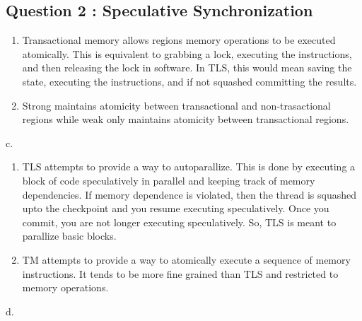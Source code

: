 \subsection{Question 2 : Speculative
Synchronization}\label{question-2-speculative-synchronization}

\begin{enumerate}
\def\labelenumi{\alph{enumi}.}
\item
  Transactional memory allows regions memory operations to be executed
  atomically. This is equivalent to grabbing a lock, executing the
  instructions, and then releasing the lock in software. In TLS, this
  would mean saving the state, executing the instructions, and if not
  squashed committing the results.
\item
  Strong maintains atomicity between transactional and non-trasactional
  regions while weak only maintains atomicity between transactional
  regions.
\end{enumerate}

c.

\begin{enumerate}
\def\labelenumi{\arabic{enumi}.}
\item
  TLS attempts to provide a way to autoparallize. This is done by
  executing a block of code speculatively in parallel and keeping track
  of memory dependencies. If memory dependence is violated, then the
  thread is squashed upto the checkpoint and you resume executing
  speculatively. Once you commit, you are not longer executing
  speculatively. So, TLS is meant to parallize basic blocks.
\item
  TM attempts to provide a way to atomically execute a sequence of
  memory instructions. It tends to be more fine grained than TLS and
  restricted to memory operations.
\end{enumerate}

d.

